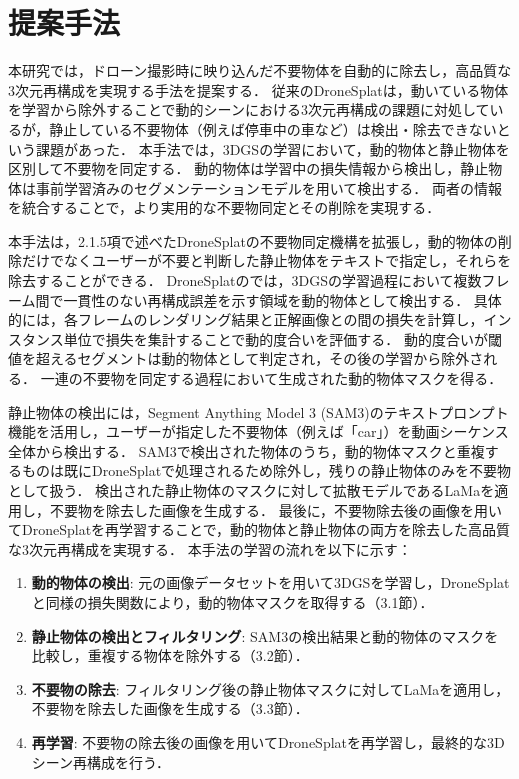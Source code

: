 \documentclass[a4paper,dvipdfmx,ja=standard,9pt]{bxjsarticle}
\begin{document}
\clearpage
\section{提案手法}
本研究では，ドローン撮影時に映り込んだ不要物体を自動的に除去し，高品質な3次元再構成を実現する手法を提案する．
従来のDroneSplat\cite{tang2025dronesplat3dgaussiansplatting}は，動いている物体を学習から除外することで動的シーンにおける3次元再構成の課題に対処しているが，静止している不要物体（例えば停車中の車など）は検出・除去できないという課題があった．
本手法では，3DGS\cite{kerbl3Dgaussians}の学習において，動的物体と静止物体を区別して不要物を同定する．
動的物体は学習中の損失情報から検出し，静止物体は事前学習済みのセグメンテーションモデルを用いて検出する．
両者の情報を統合することで，より実用的な不要物同定とその削除を実現する．

本手法は，2.1.5項で述べたDroneSplatの不要物同定機構を拡張し，動的物体の削除だけでなくユーザーが不要と判断した静止物体をテキストで指定し，それらを除去することができる．
DroneSplatのでは，3DGSの学習過程において複数フレーム間で一貫性のない再構成誤差を示す領域を動的物体として検出する．
具体的には，各フレームのレンダリング結果と正解画像との間の損失を計算し，インスタンス単位で損失を集計することで動的度合いを評価する．
動的度合いが閾値を超えるセグメントは動的物体として判定され，その後の学習から除外される．
一連の不要物を同定する過程において生成された動的物体マスクを得る．

静止物体の検出には，Segment Anything Model 3 (SAM3)\cite{carion2025sam3segmentconcepts}のテキストプロンプト機能を活用し，ユーザーが指定した不要物体（例えば「car」）を動画シーケンス全体から検出する．
SAM3で検出された物体のうち，動的物体マスクと重複するものは既にDroneSplatで処理されるため除外し，残りの静止物体のみを不要物として扱う．
検出された静止物体のマスクに対して拡散モデルであるLaMa\cite{suvorov2021resolution}を適用し，不要物を除去した画像を生成する．
最後に，不要物除去後の画像を用いてDroneSplatを再学習することで，動的物体と静止物体の両方を除去した高品質な3次元再構成を実現する．
本手法の学習の流れを以下に示す：

\begin{enumerate}
\item \textbf{動的物体の検出}: 元の画像データセットを用いて3DGSを学習し，DroneSplatと同様の損失関数により，動的物体マスクを取得する（3.1節）．
\item \textbf{静止物体の検出とフィルタリング}: SAM3\cite{carion2025sam3segmentconcepts}の検出結果と動的物体のマスクを比較し，重複する物体を除外する（3.2節）．
\item \textbf{不要物の除去}: フィルタリング後の静止物体マスクに対してLaMaを適用し，不要物を除去した画像を生成する（3.3節）．
\item \textbf{再学習}: 不要物の除去後の画像を用いてDroneSplatを再学習し，最終的な3Dシーン再構成を行う．
\end{enumerate}
\end{document}
